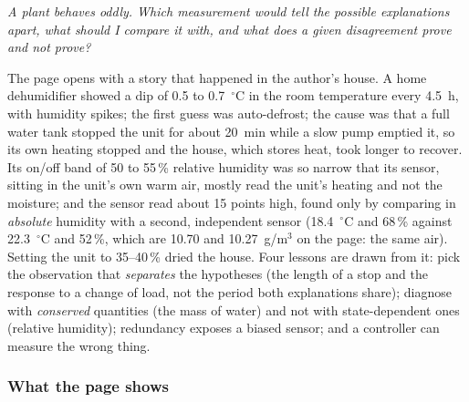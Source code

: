 \documentclass[11pt,a4paper]{article}
\begin{document}
\emph{A plant behaves oddly.  Which measurement would tell the possible
explanations apart, what should I compare it with, and what does a given
disagreement prove and not prove?}

The page opens with a story that happened in the author's house.  A home
dehumidifier showed a dip of 0.5 to 0.7~$^\circ$C in the room temperature
every 4.5~h, with humidity spikes; the first guess was auto-defrost; the cause
was that a full water tank stopped the unit for about 20~min while a slow pump
emptied it, so its own heating stopped and the house, which stores heat, took
longer to recover.  Its on/off band of 50 to 55\,\% relative humidity was so
narrow that its sensor, sitting in the unit's own warm air, mostly read the
unit's heating and not the moisture; and the sensor read about 15 points high,
found only by comparing in \emph{absolute} humidity with a second, independent
sensor (18.4~$^\circ$C and 68\,\% against 22.3~$^\circ$C and 52\,\%, which are
10.70 and 10.27~g/m$^3$ on the page: the same air).  Setting the unit to 35--40\,\%
dried the house.  Four lessons are drawn from it: pick the observation that
\emph{separates} the hypotheses (the length of a stop and the response to a
change of load, not the period both explanations share); diagnose with
\emph{conserved} quantities (the mass of water) and not with state-dependent
ones (relative humidity); redundancy exposes a biased sensor; and a controller
can measure the wrong thing.

\subsubsection*{What the page shows}
\end{document}
